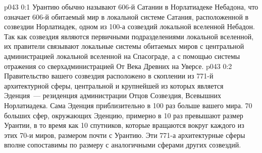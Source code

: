 \author{Малаватия Мелхиседек}
\vs p043 0:1 Урантию обычно называют 606-й Сатании в Норлатиадеке Небадона, что означает 606-й обитаемый мир в локальной системе Сатания, расположенной в созвездии Норлатиадек, одном из 100-а созвездий локальной вселенной Небадон. Так как созвездия являются первичными подразделениями локальной вселенной, их правители связывают локальные системы обитаемых миров с центральной администрацией локальной вселенной на Спасограде, а с помощью системы отражения со сверхадминистрацией От Века Древних на Уверсе.
\vs p043 0:2 \pc Правительство вашего созвездия расположено в скоплении из 771-й архитектурной сферы, центральной и крупнейшей из которых является Эденция~--- резиденция администрации Отцов Созвездия, Всевышних Норлатиадека. Сама Эденция приблизительно в 100 раз больше вашего мира. 70 больших сфер, окружающих Эденцию, примерно в 10 раз превышают размер Урантии, в то время как 10 спутников, которые вращаются вокруг каждого из этих 70-и миров, размером почти с Урантию. Эти 771-а архитектурные сферы вполне сопоставимы по размеру с аналогичными сферами других созвездий.
